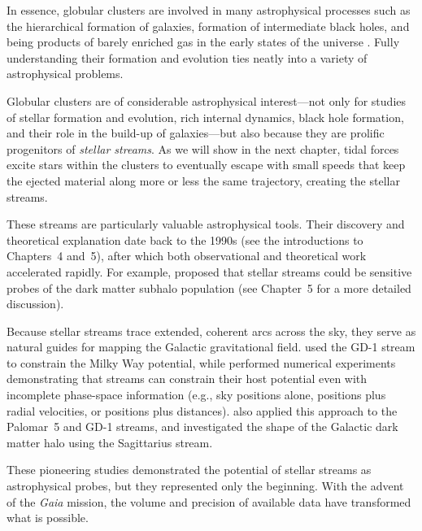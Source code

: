     In essence, globular clusters are involved in many astrophysical processes such as the hierarchical formation of galaxies, formation of intermediate black holes, and being products of barely enriched gas in the early states of the universe \citep{2016ApJ...823...52K,2025arXiv250116438K}. Fully understanding their formation and evolution ties neatly into a variety of astrophysical problems.

    Globular clusters are of considerable astrophysical interest—not only for studies of stellar formation and evolution, rich internal dynamics, black hole formation, and their role in the build-up of galaxies—but also because they are prolific progenitors of \textit{stellar streams}. As we will show in the next chapter, tidal forces excite stars within the clusters to eventually escape with small speeds that keep the ejected material along more or less the same trajectory, creating the stellar streams.

    These streams are particularly valuable astrophysical tools. Their discovery and theoretical explanation date back to the 1990s (see the introductions to Chapters~4 and~5), after which both observational and theoretical work accelerated rapidly. For example, \citet{2002MNRAS.332..915I} proposed that stellar streams could be sensitive probes of the dark matter subhalo population (see Chapter~5 for a more detailed discussion).

    Because stellar streams trace extended, coherent arcs across the sky, they serve as natural guides for mapping the Galactic gravitational field. \citet{2010ApJ...712..260K} used the GD-1 stream to constrain the Milky Way potential, while \citet{2011MNRAS.417..198V} performed numerical experiments demonstrating that streams can constrain their host potential even with incomplete phase-space information (e.g., sky positions alone, positions plus radial velocities, or positions plus distances). \citet{2016ApJ...833...31B} also applied this approach to the Palomar~5 and GD-1 streams, and \citet{2010ApJ...718.1128L} investigated the shape of the Galactic dark matter halo using the Sagittarius stream.

    These pioneering studies demonstrated the potential of stellar streams as astrophysical probes, but they represented only the beginning. With the advent of the \emph{Gaia} mission, the volume and precision of available data have transformed what is possible.

